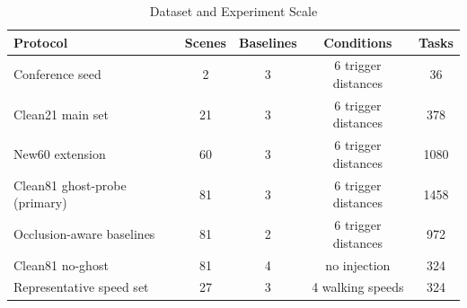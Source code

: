 \begin{table}[t]
\caption{Dataset and Experiment Scale}
\label{tab:dataset-scale}
\centering
\footnotesize
\setlength{\tabcolsep}{2pt}
\begin{tabular}{lcccc}
\toprule
Protocol & Scenes & Baselines & Conditions & Tasks \\
\midrule
Conference seed & 2 & 3 & 6 trigger distances & 36 \\
Clean21 main set & 21 & 3 & 6 trigger distances & 378 \\
New60 extension & 60 & 3 & 6 trigger distances & 1080 \\
Clean81 ghost-probe (primary) & 81 & 3 & 6 trigger distances & 1458 \\
Occlusion-aware baselines & 81 & 2 & 6 trigger distances & 972 \\
Clean81 no-ghost & 81 & 4 & no injection & 324 \\
Representative speed set & 27 & 3 & 4 walking speeds & 324 \\
\bottomrule
\end{tabular}
\end{table}
